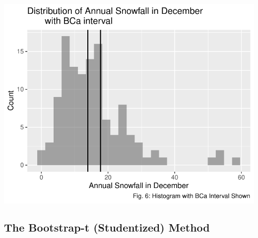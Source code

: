 \documentclass[12pt]{article}
\begin{document}
\includegraphics{paper_files/figure-latex/unnamed-chunk-15-1.pdf}

\hypertarget{the-bootstrap-t-studentized-method}{%
\subsection{The Bootstrap-t (Studentized)
Method}\label{the-bootstrap-t-studentized-method}}
\end{document}
